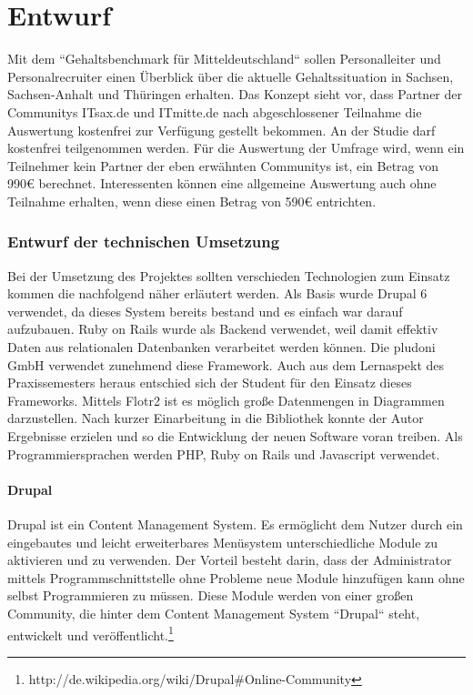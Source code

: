\part{Entwurf}
\label{sec:entwurf}
Mit dem ``Gehaltsbenchmark für Mitteldeutschland`` sollen Personalleiter und Personalrecruiter einen Überblick über die aktuelle Gehaltssituation in Sachsen, Sachsen-Anhalt und Thüringen erhalten. 
Das Konzept sieht vor, dass Partner der Communitys ITsax.de und ITmitte.de nach abgeschlossener Teilnahme die Auswertung kostenfrei zur Verfügung gestellt bekommen. An der Studie darf kostenfrei teilgenommen werden. Für die Auswertung der Umfrage wird, wenn ein Teilnehmer kein Partner der eben erwähnten Communitys ist, ein Betrag von 990€ berechnet. 
Interessenten können eine allgemeine Auswertung auch ohne Teilnahme erhalten, wenn diese einen Betrag von 590€ entrichten.
\section{Entwurf der technischen Umsetzung}
Bei der Umsetzung des Projektes sollten verschieden Technologien zum Einsatz kommen die nachfolgend näher erläutert werden. Als Basis wurde Drupal 6 verwendet, da dieses System bereits bestand und es einfach war darauf aufzubauen. Ruby on Rails wurde als Backend verwendet, weil damit effektiv Daten aus relationalen Datenbanken verarbeitet werden können. Die pludoni GmbH verwendet zunehmend diese Framework. Auch aus dem Lernaspekt des Praxissemesters heraus entschied sich der Student für den Einsatz dieses Frameworks. Mittels Flotr2 ist es möglich große Datenmengen in Diagrammen darzustellen. Nach kurzer Einarbeitung in die Bibliothek konnte der Autor Ergebnisse erzielen und so die Entwicklung der neuen Software voran treiben. 
Als Programmiersprachen werden PHP, Ruby on Rails \cite{rails} und Javascript verwendet. 
\subsection{Drupal}
Drupal ist ein Content Management System. Es ermöglicht dem Nutzer durch ein eingebautes und leicht erweiterbares Menüsystem unterschiedliche Module zu aktivieren und zu verwenden. 
Der Vorteil besteht darin, dass der Administrator mittels Programmschnittstelle ohne Probleme neue Module hinzufügen kann ohne selbst Programmieren zu müssen. 
Diese Module werden von einer großen Community, die hinter dem Content Management System ``Drupal`` steht, entwickelt und veröffentlicht.\footnote{http://de.wikipedia.org/wiki/Drupal\#Online-Community}
